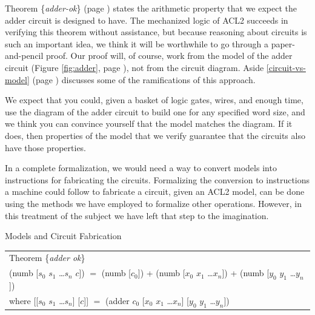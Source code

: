 Theorem \{\emph{adder-ok}\} (page \pageref{fig:adder-thm})
states the arithmetic property that
we expect the adder circuit is designed to have.
The mechanized logic of ACL2 succeeds in verifying
this theorem without assistance,
but because reasoning about circuits is such an important idea,
we think it will be worthwhile to go through
a paper-and-pencil proof.
Our proof will, of course, work from
the model of the adder circuit
(Figure \ref{fig:adder}, page \pageref{fig:adder}),
not from the circuit diagram.
Aside \ref{circuit-vs-model} (page \pageref{circuit-vs-model})
discusses some of the ramifications of this approach.

\begin{aside}
We expect that you could, given a basket of
logic gates, wires, and enough time,
use the diagram of the adder circuit to
build one for any specified word size,
and we think you can convince yourself that the model
matches the diagram.
If it does, then properties of the model
that we verify guarantee that the circuits also have those properties.

In a complete formalization, we would
need a way to convert models into instructions
for fabricating the circuits.
Formalizing the conversion to instructions a machine could
follow to fabricate a circuit, given an ACL2 model,
can be done using the methods
we have employed to formalize other operations.
However, in this treatment of the subject
we have left that step to the imagination.
\caption{Models and Circuit Fabrication}
\label{circuit-vs-model}
\end{aside}

\begin{samepage}
\label{adder-thm}
\begin{center}
\begin{tabular}{l}
Theorem \{\emph{adder ok}\} \\
(numb [$s_0$ $s_1$ \dots $s_{n}$ $c$]) $=$
(numb [$c_0$]) + (numb [$x_0$ $x_1$ \dots $x_{n}$]) + (numb [$y_0$ $y_1$ \dots $y_{n}$]) \\
where [[$s_0$ $s_1$ \dots $s_{n}$] [$c$]] $=$ (adder $c_0$ [$x_0$ $x_1$ \dots $x_{n}$] [$y_0$ $y_1$ \dots $y_{n}$])\\
\end{tabular}
\end{center}
\end{samepage}

